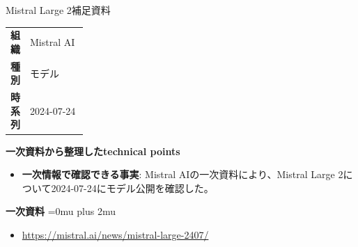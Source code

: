 \begin{technicalnote}{Mistral Large 2}{補足資料}
\begingroup
\begin{tabularx}{\linewidth}{@{}>{\bfseries}p{0.22\linewidth}X@{}}
組織 & Mistral AI \\
種別 & モデル \\
時系列 & 2024-07-24 \\
\end{tabularx}
\smallskip
{\bfseries 一次資料から整理したtechnical points}
\begin{itemize}[leftmargin=1.5em,itemsep=0.35em]
\item \textbf{一次情報で確認できる事実}: Mistral AIの一次資料により、Mistral Large 2について2024-07-24にモデル公開を確認した。
\end{itemize}
\begin{minipage}{\linewidth}
\begin{samepage}
{\bfseries 一次資料}
\begingroup\sloppy
\Urlmuskip=0mu plus 2mu\relax
\begin{itemize}[leftmargin=1.5em,itemsep=0.25em]
\item {\scriptsize\url{https://mistral.ai/news/mistral-large-2407/}}
\end{itemize}
\endgroup
\end{samepage}
\end{minipage}
\endgroup
\end{technicalnote}
\medskip

